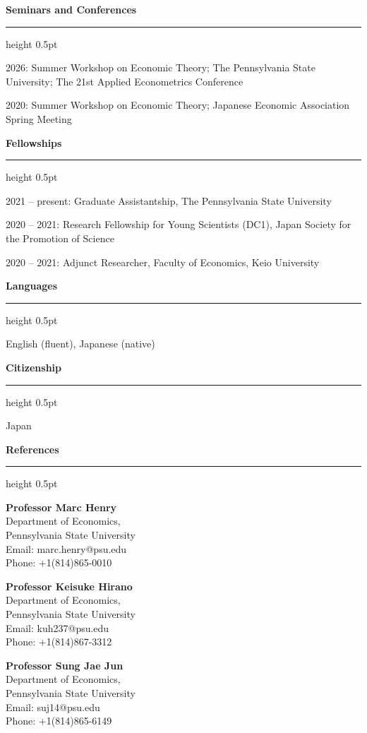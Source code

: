 \documentclass[10pt,letterpaper]{article}
\newcommand{\cvsection}[1]{%
  \vspace{1.05em}%
  {\fontsize{11.5}{14}\selectfont\bfseries #1}\par
  \vspace{3pt}%
  \hrule height 0.5pt
  \vspace{0.62em}%
}
\newenvironment{cvlist}{%
  \begin{list}{}{%
    \setlength{\leftmargin}{1.7em}%
    \setlength{\labelwidth}{0pt}%
    \setlength{\labelsep}{0pt}%
    \setlength{\itemsep}{0.50em}%
    \setlength{\parsep}{0pt}%
    \setlength{\topsep}{0pt}%
    \setlength{\partopsep}{0pt}%
  }%
}{\end{list}}
\newenvironment{cvlisttight}{%
  \begin{list}{}{%
    \setlength{\leftmargin}{1.7em}%
    \setlength{\labelwidth}{0pt}%
    \setlength{\labelsep}{0pt}%
    \setlength{\itemsep}{0.32em}%
    \setlength{\parsep}{0pt}%
    \setlength{\topsep}{0pt}%
    \setlength{\partopsep}{0pt}%
  }%
}{\end{list}}
\newcommand{\entry}{\item[]}
\begin{document}
\cvsection{Seminars and Conferences}
\begin{cvlist}
\entry 2026: Summer Workshop on Economic Theory;
       The Pennsylvania State University;
       The 21st Applied Econometrics Conference
\entry 2020: Summer Workshop on Economic Theory;
       Japanese Economic Association Spring Meeting
\end{cvlist}

\cvsection{Fellowships}
\begin{cvlist}
\entry 2021 -- present: Graduate Assistantship,
       The Pennsylvania State University
\entry 2020 -- 2021: Research Fellowship for Young Scientists (DC1),
       Japan Society for the Promotion of Science
\entry 2020 -- 2021: Adjunct Researcher, Faculty of Economics, Keio University
\end{cvlist}

\cvsection{Languages}
\begin{cvlisttight}
\entry English (fluent), Japanese (native)
\end{cvlisttight}

\cvsection{Citizenship}
\begin{cvlisttight}
\entry Japan
\end{cvlisttight}

\cvsection{References}
\begin{cvlisttight}
\item[]
\begin{minipage}[t]{0.31\linewidth}
{\bfseries Professor Marc Henry}\\
Department of Economics,\\
Pennsylvania State University\\
Email: marc.henry@psu.edu\\
Phone: +1(814)865-0010
\end{minipage}\hfill
\begin{minipage}[t]{0.31\linewidth}
{\bfseries Professor Keisuke Hirano}\\
Department of Economics,\\
Pennsylvania State University\\
Email: kuh237@psu.edu\\
Phone: +1(814)867-3312
\end{minipage}\hfill
\begin{minipage}[t]{0.31\linewidth}
{\bfseries Professor Sung Jae Jun}\\
Department of Economics,\\
Pennsylvania State University\\
Email: suj14@psu.edu\\
Phone: +1(814)865-6149
\end{minipage}
\end{cvlisttight}
\end{document}
